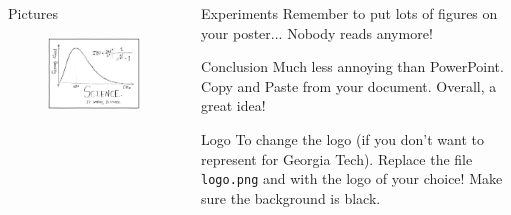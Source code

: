 \documentclass[serif,mathserif,final]{beamer}
\begin{document}
\begin{frame}{}
\begin{columns}[t]
\begin{column}{0.32\linewidth}
      \begin{block}{Pictures}
        \begin{figure}[htb]
          \centering
          \includegraphics[width=.6\columnwidth]{science}
        \end{figure}
      \end{block}

    \end{column}%

    \begin{column}{0.32\linewidth}

      \begin{block}{Experiments}
        Remember to put lots of figures on your poster... Nobody reads anymore!
      \end{block}

      \begin{block}{Conclusion}
        Much less annoying than PowerPoint.  Copy and Paste from your
        document. Overall, a great idea!
      \end{block}

      \begin{block}{Logo}
        To change the logo (if you don't want to represent for Georgia Tech).
        Replace the file {\tt logo.png} and with the logo of your choice!
        Make sure the background is black.
      \end{block}

    \end{column}%

  \end{columns}
\end{frame}
\end{document}

